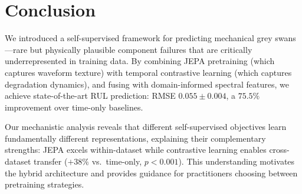\section{Conclusion}
\label{sec:conclusion}

We introduced a self-supervised framework for predicting mechanical grey swans---rare but physically plausible component failures that are critically underrepresented in training data. By combining JEPA pretraining (which captures waveform texture) with temporal contrastive learning (which captures degradation dynamics), and fusing with domain-informed spectral features, we achieve state-of-the-art RUL prediction: RMSE $0.055 \pm 0.004$, a $75.5\%$ improvement over time-only baselines.

Our mechanistic analysis reveals that different self-supervised objectives learn fundamentally different representations, explaining their complementary strengths: JEPA excels within-dataset while contrastive learning enables cross-dataset transfer ($+38\%$ vs.\ time-only, $p < 0.001$). This understanding motivates the hybrid architecture and provides guidance for practitioners choosing between pretraining strategies.

